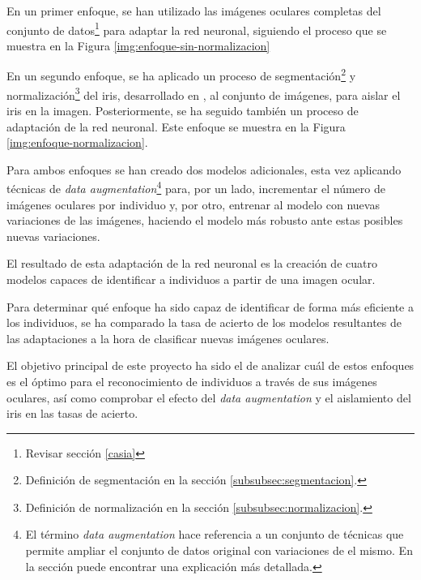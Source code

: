 En un primer enfoque, se han utilizado las imágenes oculares completas del conjunto de datos\footnote{Revisar sección \ref{casia}} para adaptar la red neuronal, siguiendo el proceso que se muestra en la Figura \ref{img:enfoque-sin-normalizacion}



En un segundo enfoque, se ha aplicado un proceso de segmentación\footnote{Definición de segmentación en la sección \ref{subsubsec:segmentacion}.} y normalización\footnote{Definición de normalización en la sección \ref{subsubsec:normalizacion}.} del iris, desarrollado en \cite{tfg_iris_2020}, al conjunto de imágenes, para aislar el iris en la imagen. Posteriormente, se ha seguido también un proceso de adaptación de la red neuronal. Este enfoque se muestra en la Figura \ref{img:enfoque-normalizacion}.



Para ambos enfoques se han creado dos modelos adicionales, esta vez aplicando técnicas de \textit{data augmentation}\footnote{El término \textit{data augmentation} hace referencia a un conjunto de técnicas que permite ampliar el conjunto de datos original con variaciones de el mismo. En la sección  puede encontrar una explicación más detallada.} para, por un lado, incrementar el número de imágenes oculares por individuo y, por otro, entrenar al modelo con nuevas variaciones de las imágenes, haciendo el modelo más robusto ante estas posibles nuevas variaciones.

El resultado de esta adaptación de la red neuronal es la creación de cuatro modelos capaces de identificar a individuos a partir de una imagen ocular. 

Para determinar qué enfoque ha sido capaz de identificar de forma más eficiente a los individuos, se ha comparado la tasa de acierto de los modelos resultantes de las adaptaciones a la hora de clasificar nuevas imágenes oculares. 

El objetivo principal de este proyecto ha sido el de analizar cuál de estos enfoques es el óptimo para el reconocimiento de individuos a través de sus imágenes oculares, así como comprobar el efecto del \textit{data augmentation } y el aislamiento del iris en las tasas de acierto.

